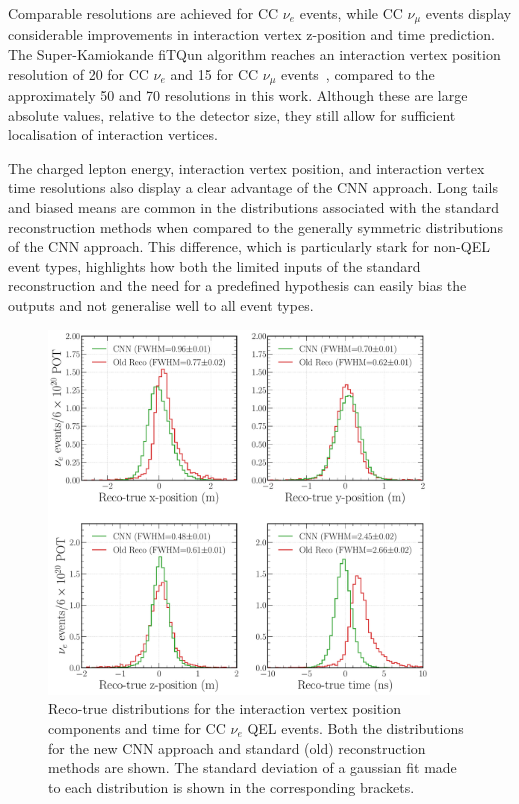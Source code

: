 Comparable resolutions are achieved for CC $\nu_{e}$ events, while CC $\nu_{\mu}$ events display
considerable improvements in interaction vertex z-position and time prediction. The
Super-Kamiokande fiTQun algorithm reaches an interaction vertex position resolution of
\SI{20}{} for CC $\nu_{e}$ and \SI{15}{} for CC $\nu_{\mu}$
events~\cite{jiang2019}, compared to the approximately \SI{50}{} and \SI{70}{}
resolutions in this work. Although these are large absolute values, relative to the detector size,
they still allow for sufficient localisation of interaction vertices.

The charged lepton energy, interaction vertex position, and interaction vertex time resolutions
also display a clear advantage of the CNN approach. Long tails and biased means are common in the
distributions associated with the standard reconstruction methods when compared to the generally
symmetric distributions of the CNN approach. This difference, which is particularly stark for
non-QEL event types, highlights how both the limited inputs of the standard reconstruction and the
need for a predefined hypothesis can easily bias the outputs and not generalise well to all event
types.

\begin{figure} %
    \includegraphics[width=0.9\textwidth]{diagrams/7-results/final_vertex_nuel_res_comparison.pdf}
    \caption[Reco-true distributions for the interaction vertex parameters for CC $\nu_{e}$ QEL
        events] {Reco-true distributions for the interaction vertex position components and time
        for CC $\nu_{e}$ QEL events. Both the distributions for the new CNN approach and standard
        (old) reconstruction methods are shown. The standard deviation of a gaussian fit made to
        each distribution is shown in the corresponding brackets.}
    \label{fig:final_vertex_nuel_res_comparison}
\end{figure}

